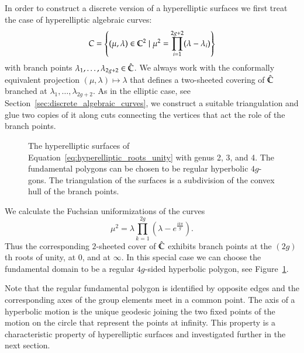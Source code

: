 \documentclass[Thesis]{subfiles}
\begin{document}
In order to construct a discrete version of a hyperelliptic surfaces we first treat the case of hyperelliptic algebraic curves:
\begin{equation}
C=\left\{(\mu,\lambda)\in \mathbb C^2 \mid \mu^2=\prod_{i=1}^{2g+2}(\lambda - \lambda_i)\right\}
\end{equation}
with branch points $\lambda_1,\ldots,\lambda_{2g+2}\in \hat{\mathbb C}$.
We always work with the conformally equivalent projection $(\mu, \lambda)\mapsto \lambda$ that defines a two-sheeted covering of $\hat{\mathbb C}$ branched at $\lambda_1,\ldots,\lambda_{2g+2}$. 
As in the elliptic case, see Section~\ref{sec:discrete_algebraic_curves}, we construct a suitable triangulation and glue two copies of it along cuts connecting the vertices that act the role of the branch points.

\begin{figure} 
\centering
{}
\caption{
The hyperelliptic surfaces of Equation~\ref{eq:hyperelliptic_roots_unity} with genus 2, 3, and 4. 
The fundamental polygons can be chosen to be regular hyperbolic $4g$-gons. 
The triangulation of the surfaces is a subdivision of the convex hull of the branch points.
} 
\label{fig:roots_of_unity_curve} 
\end{figure}

We calculate the Fuchsian uniformizations of the curves
\begin{equation}
	\mu^2=\lambda\prod_{k=1}^{2g}\left(\lambda-e^{\frac{ik\pi}{g}}\right).\label{eq:hyperelliptic_roots_unity}
\end{equation}
Thus the corresponding $2$-sheeted cover of $\hat{\mathbb C}$ exhibits branch points at the $(2g)$th roots of unity, at $0$, and at $\infty$. 
In this special case we can choose the fundamental domain to be a regular $4g$-sided hyperbolic polygon, see Figure~\ref{fig:roots_of_unity_curve}.

Note that the regular fundamental polygon is identified by opposite edges and the corresponding axes of the group elements meet in a common point.
The axis of a hyperbolic motion is the unique geodesic joining the two fixed points of the motion on the circle that represent the points at infinity.
This property is a characteristic property of hyperelliptic surfaces and investigated further in the next section.
\end{document}
